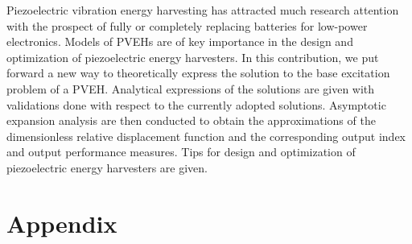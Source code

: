 \documentclass{article}
\begin{document}
Piezoelectric vibration energy harvesting has attracted much research attention with the prospect of fully or completely replacing batteries for low-power electronics. Models of PVEHs are of key importance in the design and optimization of piezoelectric energy harvesters. In this contribution, we put forward a new way to theoretically express the solution to the base excitation problem of a PVEH. Analytical expressions of the solutions are given with validations done with respect to the currently adopted solutions. Asymptotic expansion analysis are then conducted to obtain the approximations of the dimensionless relative displacement function and the corresponding output index and output performance measures. Tips for design and optimization of piezoelectric energy harvesters are given. 

\section*{Appendix}
\label{sec:sec_appendix}
\end{document}
